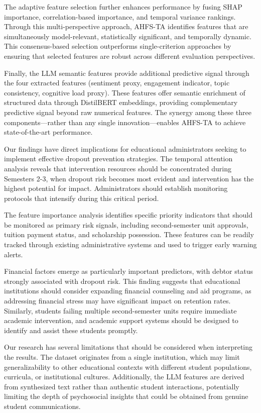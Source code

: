 \documentclass[journal]{IEEEtran}
\begin{document}
The adaptive feature selection further enhances performance by fusing SHAP importance, correlation-based importance, and temporal variance rankings. Through this multi-perspective approach, AHFS-TA identifies features that are simultaneously model-relevant, statistically significant, and temporally dynamic. This consensus-based selection outperforms single-criterion approaches by ensuring that selected features are robust across different evaluation perspectives.

Finally, the LLM semantic features provide additional predictive signal through the four extracted features (sentiment proxy, engagement indicator, topic consistency, cognitive load proxy). These features offer semantic enrichment of structured data through DistilBERT embeddings, providing complementary predictive signal beyond raw numerical features. The synergy among these three components---rather than any single innovation---enables AHFS-TA to achieve state-of-the-art performance.

Our findings have direct implications for educational administrators seeking to implement effective dropout prevention strategies. The temporal attention analysis reveals that intervention resources should be concentrated during Semesters 2-3, when dropout risk becomes most evident and intervention has the highest potential for impact. Administrators should establish monitoring protocols that intensify during this critical period.

The feature importance analysis identifies specific priority indicators that should be monitored as primary risk signals, including second-semester unit approvals, tuition payment status, and scholarship possession. These features can be readily tracked through existing administrative systems and used to trigger early warning alerts.

Financial factors emerge as particularly important predictors, with debtor status strongly associated with dropout risk. This finding suggests that educational institutions should consider expanding financial counseling and aid programs, as addressing financial stress may have significant impact on retention rates. Similarly, students failing multiple second-semester units require immediate academic intervention, and academic support systems should be designed to identify and assist these students promptly.

Our research has several limitations that should be considered when interpreting the results. The dataset originates from a single institution, which may limit generalizability to other educational contexts with different student populations, curricula, or institutional cultures. Additionally, the LLM features are derived from synthesized text rather than authentic student interactions, potentially limiting the depth of psychosocial insights that could be obtained from genuine student communications.
\end{document}
